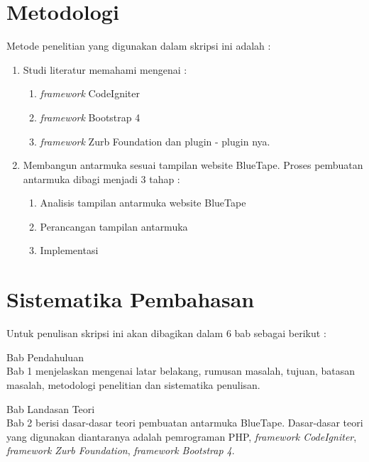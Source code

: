\section{Metodologi}
\label{sec:metlit}
%
Metode penelitian yang digunakan dalam skripsi ini adalah :
\begin{enumerate}
	\item Studi literatur memahami mengenai :
	\begin{enumerate}
		\item \textit{framework} CodeIgniter
		\item \textit{framework} Bootstrap 4
		\item \textit{framework} Zurb Foundation dan plugin - plugin nya.
	\end{enumerate}
	\item  Membangun antarmuka sesuai tampilan website BlueTape. Proses pembuatan antarmuka dibagi menjadi 3 tahap :
	\begin{enumerate}
		\item Analisis tampilan antarmuka website BlueTape
		\item Perancangan tampilan antarmuka
		\item Implementasi		
	\end{enumerate}
\end{enumerate}


\section{Sistematika Pembahasan}
\label{sec:sispem}
Untuk penulisan skripsi ini akan dibagikan dalam 6 bab sebagai berikut :
\doublespacing
\begin{singlespace}
\noindent Bab Pendahuluan \\
Bab 1 menjelaskan mengenai latar belakang, rumusan masalah, tujuan, batasan masalah, metodologi penelitian dan sistematika penulisan.
\end{singlespace}

\begin{singlespace}
\noindent Bab Landasan Teori \\
Bab 2 berisi dasar-dasar teori pembuatan antarmuka BlueTape. Dasar-dasar teori yang digunakan diantaranya adalah pemrograman PHP, \textit{framework CodeIgniter}, \textit{framework Zurb Foundation}, \textit{framework Bootstrap 4}.
\end{singlespace}

